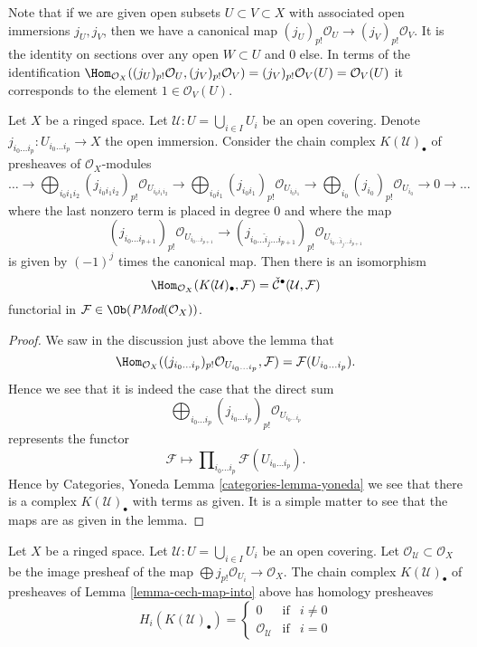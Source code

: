 \medskip\noindent
Note that if we are given open subsets $U \subset V \subset X$
with associated open immersions $j_U, j_V$, then we have a canonical
map $(j_U)_{p!}\mathcal{O}_U \to (j_V)_{p!}\mathcal{O}_V$. It is the
identity on sections over any open $W \subset U$ and $0$ else.
In terms of the identification
$\Hom_{\mathcal{O}_X}((j_U)_{p!}\mathcal{O}_U, (j_V)_{p!}\mathcal{O}_V) =
(j_V)_{p!}\mathcal{O}_V(U) = \mathcal{O}_V(U)$ it corresponds to
the element $1 \in \mathcal{O}_V(U)$.

\begin{lemma}
\label{lemma-cech-map-into}
Let $X$ be a ringed space.
Let $\mathcal{U} : U = \bigcup_{i \in I} U_i$ be an open covering.
Denote $j_{i_0\ldots i_p} : U_{i_0 \ldots i_p} \to X$ the open immersion.
Consider the chain complex $K(\mathcal{U})_\bullet$
of presheaves of $\mathcal{O}_X$-modules
$$
\ldots
\to
\bigoplus_{i_0i_1i_2} (j_{i_0i_1i_2})_{p!}\mathcal{O}_{U_{i_0i_1i_2}}
\to
\bigoplus_{i_0i_1} (j_{i_0i_1})_{p!}\mathcal{O}_{U_{i_0i_1}}
\to
\bigoplus_{i_0} (j_{i_0})_{p!}\mathcal{O}_{U_{i_0}}
\to 0 \to \ldots
$$
where the last nonzero term is placed in degree $0$
and where the map
$$
(j_{i_0\ldots i_{p + 1}})_{p!}\mathcal{O}_{U_{i_0\ldots i_{p + 1}}}
\longrightarrow
(j_{i_0\ldots \hat i_j \ldots i_{p + 1}})_{p!}
\mathcal{O}_{U_{i_0\ldots \hat i_j \ldots i_{p + 1}}}
$$
is given by $(-1)^j$ times the canonical map.
Then there is an isomorphism
$$
\Hom_{\mathcal{O}_X}(K(\mathcal{U})_\bullet, \mathcal{F})
=
\check{\mathcal{C}}^\bullet(\mathcal{U}, \mathcal{F})
$$
functorial in $\mathcal{F} \in \Ob(\textit{PMod}(\mathcal{O}_X))$.
\end{lemma}

\begin{proof}
We saw in the discussion just above the lemma that
$$
\Hom_{\mathcal{O}_X}(
(j_{i_0\ldots i_p})_{p!}\mathcal{O}_{U_{i_0\ldots i_p}},
\mathcal{F})
=
\mathcal{F}(U_{i_0\ldots i_p}).
$$
Hence we see that it is indeed the case that the direct sum
$$
\bigoplus\nolimits_{i_0 \ldots i_p}
(j_{i_0 \ldots i_p})_{p!}\mathcal{O}_{U_{i_0 \ldots i_p}}
$$
represents the functor
$$
\mathcal{F}
\longmapsto
\prod\nolimits_{i_0\ldots i_p} \mathcal{F}(U_{i_0\ldots i_p}).
$$
Hence by Categories, Yoneda Lemma \ref{categories-lemma-yoneda}
we see that there is a complex $K(\mathcal{U})_\bullet$ with terms
as given. It is a simple matter to see that the maps are as given
in the lemma.
\end{proof}

\begin{lemma}
\label{lemma-homology-complex}
Let $X$ be a ringed space.
Let $\mathcal{U} : U = \bigcup_{i \in I} U_i$ be an open covering.
Let $\mathcal{O}_\mathcal{U} \subset \mathcal{O}_X$
be the image presheaf of the map
$\bigoplus j_{p!}\mathcal{O}_{U_i} \to \mathcal{O}_X$.
The chain complex $K(\mathcal{U})_\bullet$ of presheaves
of Lemma \ref{lemma-cech-map-into} above has homology presheaves
$$
H_i(K(\mathcal{U})_\bullet) =
\left\{
\begin{matrix}
0 & \text{if} & i \not = 0 \\
\mathcal{O}_\mathcal{U} & \text{if} & i = 0
\end{matrix}
\right.
$$
\end{lemma}


